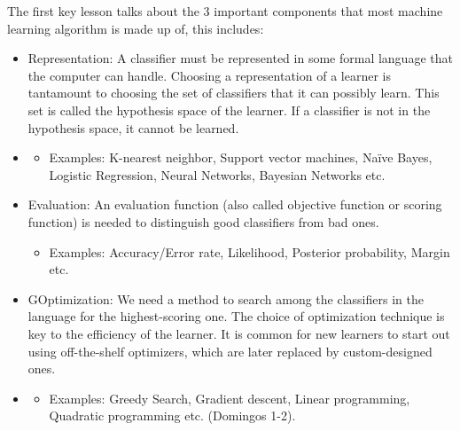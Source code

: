 \documentclass[a4paper,12pt]{report}
\begin{document}
The first key lesson talks about the 3 important components that most machine learning algorithm is made up of, this includes:

\begin{itemize}[,]
    \setlength\itemsep{-.1cm}
    \item Representation: A classifier must be represented in some formal language that the computer can handle. Choosing a representation of a learner is tantamount to choosing the set of classifiers that it can possibly learn. This set is called the hypothesis space of the learner. If a classifier is not in the hypothesis space, it cannot be learned.
    \vspace*{-2mm}
    \item \begin{itemize}[,]
        \setlength\itemsep{0cm}
        \item Examples: K-nearest neighbor, Support vector machines, Naïve Bayes, Logistic Regression, Neural Networks, Bayesian Networks etc.
    \end{itemize}
    \item Evaluation: An evaluation function (also called objective function or scoring function) is needed to distinguish good classifiers from bad ones.
    \vspace*{-2mm}
    \begin{itemize}[,]
        \setlength\itemsep{0cm}
        \item Examples: Accuracy/Error rate, Likelihood, Posterior probability, Margin etc.
    \end{itemize}
    \item GOptimization: We need a method to search among the classifiers in the language for the highest-scoring one. The choice of optimization technique is key to the efficiency of the learner. It is common for new learners to start out using off-the-shelf optimizers, which are later replaced by custom-designed ones.
    \vspace*{-2mm}
    \item \begin{itemize}[,]
        \setlength\itemsep{0cm}
        \item Examples: Greedy Search, Gradient descent, Linear programming, Quadratic programming etc. (Domingos 1-2).
    \end{itemize}
\end{itemize}
\end{document}
